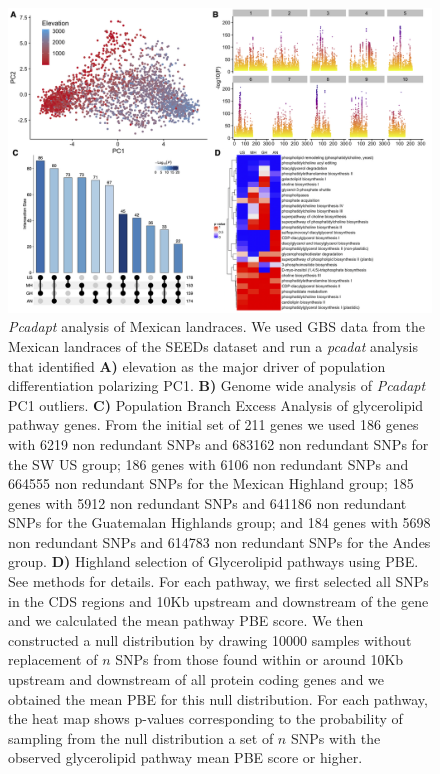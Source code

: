 \documentclass[9pt,twocolumn,twoside,lineno]{BioRxiv}
\begin{document}
\clearpage

\renewcommand{\thefigure}{S\arabic{figure}}
\renewcommand{\thetable}{S\arabic{table}}%

\setcounter{figure}{0}
\setcounter{table}{0}

\begin{figure}[t]
\begin{center}
\includegraphics[width=0.9\paperwidth]{Sup_Figures/Sup_Fig_1.png}
\caption{\textit{Pcadapt} analysis of Mexican landraces. We used GBS data from the Mexican landraces of the SEEDs dataset \cite{Romero_Navarro2017-cn} and run a \textit{pcadat} analysis \cite{Luu2017-ws} that identified \textbf{A)} elevation as the major driver of population differentiation polarizing PC1.  
\textbf{B)} Genome wide analysis of \textit{Pcadapt} PC1 outliers. 
\textbf{C)} Population Branch Excess Analysis of glycerolipid pathway genes.
From the initial set of 211 genes we used 186 genes with 6219 non redundant SNPs and 683162 non redundant SNPs for the SW US group; 186 genes with 6106 non redundant SNPs and 664555 non redundant SNPs for the Mexican Highland group; 185 genes with 5912 non redundant SNPs and 641186 non redundant SNPs for the Guatemalan Highlands group; and 184 genes with 5698 non redundant SNPs and 614783 non redundant SNPs for the Andes group.
\textbf{D)} Highland selection of Glycerolipid pathways using PBE. See methods for details.
For each pathway, we first selected all SNPs in the CDS regions and 10Kb upstream and downstream of the gene and we calculated the mean pathway PBE score. 
We then constructed a null distribution by drawing 10000 samples without replacement of $n$ SNPs from those found within or around 10Kb upstream and downstream of all protein coding genes and we obtained the mean PBE for this null distribution. 
For each pathway, the heat map shows p-values corresponding to the probability of sampling from the null distribution a set of $n$ SNPs with the observed glycerolipid pathway mean PBE score or higher. 
}
\label{SupFig1}
\end{center}
\end{figure} 
\end{document}
